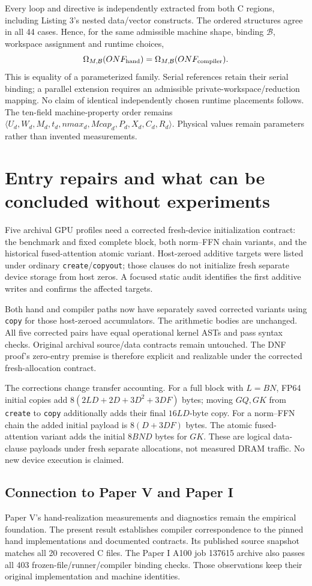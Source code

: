 Every loop and directive is independently extracted from both C regions,
including Listing 3's nested data/vector constructs. The ordered structures
agree in all 44 cases. Hence, for the same admissible machine shape, binding
$\mathcal B$, workspace assignment and runtime choices,
\[
\Omega_{M,\mathcal B}(ONF_{\rm hand})=
\Omega_{M,\mathcal B}(ONF_{\rm compiler}).
\]
This is equality of a parameterized family. Serial references retain their serial
binding; a parallel extension requires an admissible private-workspace/reduction
mapping. No claim of identical independently chosen runtime placements follows.
The ten-field machine-property order remains
$\langle U_d,W_d,M_d,t_d,nmax_d,Mcap_d,P_d,X_d,C_d,R_d\rangle$.
Physical values remain parameters rather than invented measurements.

\newpage\section{Entry repairs and what can be concluded without experiments}
Five archival GPU profiles need a corrected fresh-device initialization contract:
the benchmark and fixed complete block, both norm--FFN chain variants, and the
historical fused-attention atomic variant. Host-zeroed additive targets were
listed under ordinary \texttt{create}/\texttt{copyout}; those clauses do not
initialize fresh separate device storage from host zeros. A focused static audit
identifies the first additive writes and confirms the affected targets.

Both hand and compiler paths now have separately saved corrected variants using
\texttt{copy} for those host-zeroed accumulators. The arithmetic bodies are
unchanged. All five corrected pairs have equal operational kernel ASTs and pass
syntax checks. Original archival source/data contracts remain untouched. The
DNF proof's zero-entry premise is therefore explicit and realizable under the
corrected fresh-allocation contract.

The corrections change transfer accounting. For a full block with $L=BN$, FP64
initial copies add $8(2LD+2D+3D^2+3DF)$ bytes; moving $GQ,GK$ from
\texttt{create} to \texttt{copy} additionally adds their final $16LD$-byte copy.
For a norm--FFN chain the added initial payload is $8(D+3DF)$ bytes. The atomic
fused-attention variant adds the initial $8BND$ bytes for $GK$. These are logical
data-clause payloads under fresh separate allocations, not measured DRAM traffic.
No new device execution is claimed.

\subsection{Connection to Paper V and Paper I}
Paper V's hand-realization measurements and diagnostics remain the empirical
foundation. The present result establishes compiler correspondence to the pinned
hand implementations and documented contracts. Its published source snapshot
matches all 20 recovered C files. The Paper I A100 job 137615 archive also passes
all 403 frozen-file/runner/compiler binding checks. Those observations keep their
original implementation and machine identities.

